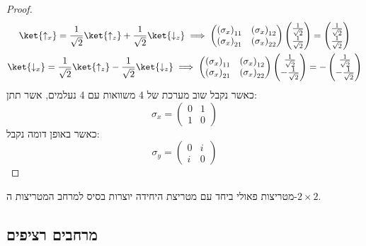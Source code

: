 \documentclass{tstextbook}
\begin{document}
\begin{proof}
$$\begin{gather}\ket{\uparrow_{x}} = \frac{1}{\sqrt{ 2 }}\ket{\uparrow_{z}} +\frac{1}{\sqrt{ 2 }}\ket{\downarrow_{z}} \implies \begin{pmatrix}\left( \sigma_{x} \right)_{11} & \left( \sigma_{x} \right)_{12} \\\left( \sigma_{x} \right)_{21} & \left( \sigma_{x} \right)_{22}\end{pmatrix}\begin{pmatrix}\frac{1}{\sqrt{ 2 }} \\\frac{1}{\sqrt{ 2 }}\end{pmatrix}=\begin{pmatrix}\frac{1}{\sqrt{ 2 }} \\\frac{1}{\sqrt{ 2 }}\end{pmatrix} \\\ket{\downarrow_{x}} = \frac{1}{\sqrt{ 2 }}\ket{\uparrow_{z}} -\frac{1}{\sqrt{ 2 }}\ket{\downarrow_{z}} \implies \begin{pmatrix}\left( \sigma_{x} \right)_{11} & \left( \sigma_{x} \right)_{12} \\\left( \sigma_{x} \right)_{21} & \left( \sigma_{x} \right)_{22}\end{pmatrix}\begin{pmatrix}\frac{1}{\sqrt{ 2 }} \\-\frac{1}{\sqrt{ 2 }}\end{pmatrix}=-\begin{pmatrix}\frac{1}{\sqrt{ 2 }} \\-\frac{1}{\sqrt{ 2 }}\end{pmatrix} 
\end{gather}$$
כאשר נקבל שוב מערכת של 4 משוואות עם 4 נעלמים, אשר תתן:
$$\sigma_{x}=\begin{pmatrix}0 & 1 \\1 & 0
\end{pmatrix}$$
כאשר באופן דומה נקבל:
$$\sigma_{y}=\begin{pmatrix}0 & i \\i & 0
\end{pmatrix}$$

\end{proof}
\begin{remark}
מטריצות פאולי ביחד עם מטריצת היחידה יוצרות בסיס למרחב המטריצות ה-\(2\times 2\).

\end{remark}
\subsection{מרחבים רציפים}
\end{document}

